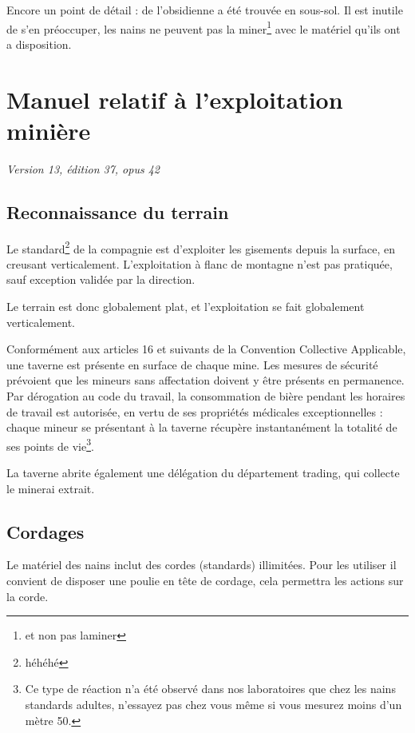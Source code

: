   Encore un point de détail : de l'obsidienne a été trouvée en sous-sol. Il
  est inutile de s'en préoccuper, les nains ne peuvent pas la miner\footnote{et
  non pas laminer} avec le matériel qu'ils ont a disposition.

\newpage

\section{Manuel relatif à l'exploitation minière}

  \textit{Version 13, édition 37, opus 42}

\subsection{Reconnaissance du terrain}

  Le standard\footnote{héhéhé} de la compagnie est d'exploiter les gisements
  depuis la surface, en creusant verticalement. L'exploitation à flanc de
  montagne n'est pas pratiquée, sauf exception validée par la direction.

  Le terrain est donc globalement plat, et l'exploitation se fait globalement
  verticalement.

  Conformément aux articles 16 et suivants de la Convention Collective
  Applicable, une taverne est présente en surface de chaque mine. Les mesures
  de sécurité prévoient que les mineurs sans affectation doivent y être
  présents en permanence. Par dérogation au code du travail, la consommation de
  bière pendant les horaires de travail est autorisée, en vertu de ses
  propriétés médicales exceptionnelles : chaque mineur se présentant à la
  taverne récupère instantanément la totalité de ses points de vie\footnote{Ce
  type de réaction n'a été observé dans nos laboratoires que chez les nains
  standards adultes, n'essayez pas chez vous même si vous mesurez moins d'un
  mètre 50.}.

  La taverne abrite également une délégation du département trading, qui
  collecte le minerai extrait.

\subsection{Cordages}

  Le matériel des nains inclut des cordes (standards) illimitées. Pour les
  utiliser il convient de disposer une poulie en tête de cordage, cela
  permettra les actions sur la corde.

